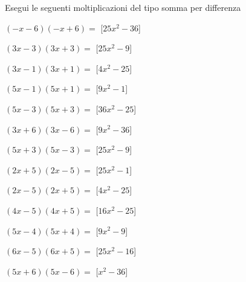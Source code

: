 \begin{esercizio}
 \label{ese:11.17}
Esegui le seguenti moltiplicazioni del tipo somma per differenza
 \begin{multicols}{2}
\begin{enumeratea}
\item \(\left(- x - 6\right)\left(- x + 6\right)=\)
  \hfill [\(25 x^{2} - 36\)]
\item \(\left(3 x - 3\right)\left(3 x + 3\right)=\)
  \hfill [\(25 x^{2} - 9\)]
\item \(\left(3 x - 1\right)\left(3 x + 1\right)=\)
  \hfill [\(4 x^{2} - 25\)]
\item \(\left(5 x - 1\right)\left(5 x + 1\right)=\)
  \hfill [\(9 x^{2} - 1\)]
\item \(\left(5 x - 3\right)\left(5 x + 3\right)=\)
  \hfill [\(36 x^{2} - 25\)]
\item \(\left(3 x + 6\right)\left(3 x - 6\right)=\)
  \hfill [\(9 x^{2} - 36\)]
\item \(\left(5 x + 3\right)\left(5 x - 3\right)=\)
  \hfill [\(25 x^{2} - 9\)]
\item \(\left(2 x + 5\right)\left(2 x - 5\right)=\)
  \hfill [\(25 x^{2} - 1\)]
\item \(\left(2 x - 5\right)\left(2 x + 5\right)=\)
  \hfill [\(4 x^{2} - 25\)]
\item \(\left(4 x - 5\right)\left(4 x + 5\right)=\)
  \hfill [\(16 x^{2} - 25\)]
\item \(\left(5 x - 4\right)\left(5 x + 4\right)=\)
  \hfill [\(9 x^{2} - 9\)]
\item \(\left(6 x - 5\right)\left(6 x + 5\right)=\)
  \hfill [\(25 x^{2} - 16\)]
\item \(\left(5 x + 6\right)\left(5 x - 6\right)=\)
  \hfill [\(x^{2} - 36\)]

\end{enumeratea}
\end{multicols}
\end{esercizio}
